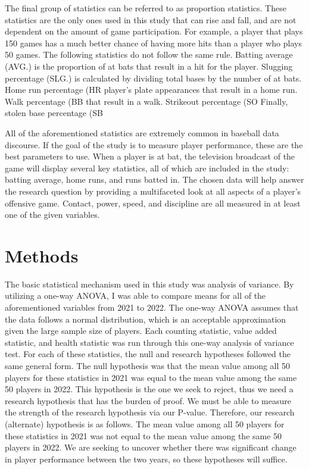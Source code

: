 \documentclass[10pt]{article}
\begin{document}
The final group of statistics can be referred to as proportion statistics. These statistics are the only ones used in this 
study that can rise and fall, and are not dependent on the amount of game participation. For example, a player that plays 150 
games has a much better chance of having more hits than a player who plays 50 games. The following statistics do not follow 
the same rule. Batting average (AVG.) is the proportion of at bats that result in a hit for the player. Slugging percentage 
(SLG.) is calculated by dividing total bases by the number of at bats. Home run percentage (HR%
player’s plate appearances that result in a home run. Walk percentage (BB%
that result in a walk. Strikeout percentage (SO%
Finally, stolen base percentage (SB%

All of the aforementioned statistics are extremely common in baseball data discourse. If the goal of the study is to measure 
player performance, these are the best parameters to use. When a player is at bat, the television broadcast of the game will 
display several key statistics, all of which are included in the study: batting average, home runs, and runs batted in. The 
chosen data will help answer the research question by providing a multifaceted look at all aspects of a player’s offensive 
game. Contact, power, speed, and discipline are all measured in at least one of the given variables.

\section{Methods}
The basic statistical mechanism used in this study was analysis of variance. By utilizing a one-way ANOVA, I was able to 
compare means for all of the aforementioned variables from 2021 to 2022. The one-way ANOVA assumes that the data follows a 
normal distribution, which is an acceptable approximation given the large sample size of players. Each counting statistic, 
value added statistic, and health statistic was run through this one-way analysis of variance test. For each of these 
statistics, the null and research hypotheses followed the same general form. The null hypothesis was that the mean value 
among all 50 players for these statistics in 2021 was equal to the mean value among the same 50 players in 2022. This 
hypothesis is the one we seek to reject, thus we need a research hypothesis that has the burden of proof. We must be able 
to measure the strength of the research hypothesis via our P-value. Therefore, our research (alternate) hypothesis is as 
follows. The mean value among all 50 players for these statistics in 2021 was not equal to the mean value among the same 50 
players in 2022. We are seeking to uncover whether there was significant change in player performance between the two years, 
so these hypotheses will suffice. 
\end{document}
